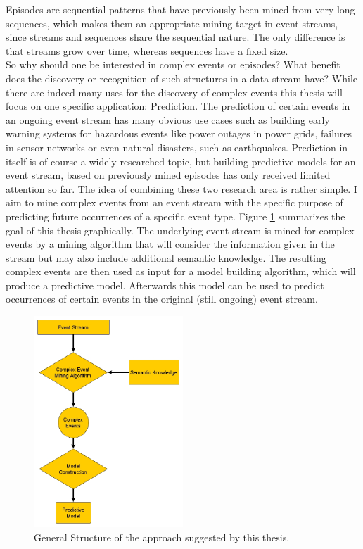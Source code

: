 Episodes are sequential patterns that have previously been mined from very long sequences, which makes them an appropriate mining target in event streams, since streams and sequences share the sequential nature. The only difference is that streams grow over time, whereas sequences have a fixed size.\\
So why should one be interested in complex events or episodes? What benefit does the discovery or recognition of such structures in a data stream have? While there are indeed many uses for the discovery of complex events this thesis will focus on one specific application: Prediction. The prediction of certain events in an ongoing event stream has many obvious use cases such as building early warning systems for hazardous events like power outages in power grids, failures in sensor networks or even natural disasters, such as earthquakes. Prediction in itself is of course a widely researched topic, but building predictive models for an event stream, based on previously mined episodes has only received limited attention so far.
The idea of combining these two research area is rather simple. I aim to mine complex events from an event stream with the specific purpose of predicting future occurrences of a specific event type. \newline
Figure \ref{fig_approach} summarizes the goal of this thesis graphically. The underlying event stream is mined for complex events by a mining algorithm that will consider the information given in the stream but may also include additional semantic knowledge. The resulting complex events are then used as input for a model building algorithm, which will produce a predictive model. Afterwards this model can be used to predict occurrences of certain events in the original (still ongoing) event stream.
\begin{figure}[h]
	\centering
  	\includegraphics[width=0.5\textwidth]{approach.jpg}
	\caption{General Structure of the approach suggested by this thesis.}
	\label{fig_approach}
\end{figure}

